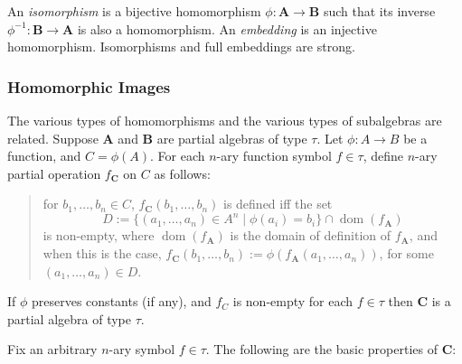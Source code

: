 \documentclass[12pt]{article}
\begin{document}
An \emph{isomorphism} is a bijective homomorphism $\phi: \boldsymbol{A}\to \boldsymbol{B}$ such that its inverse $\phi^{-1}: \boldsymbol{B}\to \boldsymbol{A}$ is also a homomorphism.  An \emph{embedding} is an injective homomorphism.  Isomorphisms and full embeddings are strong.

\subsubsection*{Homomorphic Images}

The various types of homomorphisms and the various types of subalgebras are related.  Suppose $\boldsymbol{A}$ and $\boldsymbol{B}$ are partial algebras of type $\tau$.  Let $\phi:A\to B$ be a function, and $C=\phi(A)$.  For each $n$-ary function symbol $f\in \tau$, define $n$-ary partial operation $f_{\boldsymbol{C}}$ on $C$ as follows: 
\begin{quote}
for $b_1,\ldots, b_n\in C$, $f_{\boldsymbol{C}}(b_1,\ldots, b_n)$ is defined iff the set $$D:=\lbrace (a_1,\ldots, a_n)\in A^n \mid \phi(a_i)=b_i\rbrace \cap \operatorname{dom}(f_{\boldsymbol{A}})$$ is non-empty, where $\operatorname{dom}(f_{\boldsymbol{A}})$ is the domain of definition of $f_{\boldsymbol{A}}$, and when this is the case, $f_{\boldsymbol{C}}(b_1,\ldots, b_n):=\phi(f_{\boldsymbol{A}}(a_1,\ldots, a_n))$, for some $(a_1,\ldots, a_n)\in D$.  
\end{quote}
If $\phi$ preserves constants (if any), and $f_C$ is non-empty for each $f\in \tau$ then $\boldsymbol{C}$ is a partial algebra of type $\tau$.

Fix an arbitrary $n$-ary symbol $f\in \tau$.  The following are the basic properties of $\boldsymbol{C}$:
\end{document}
